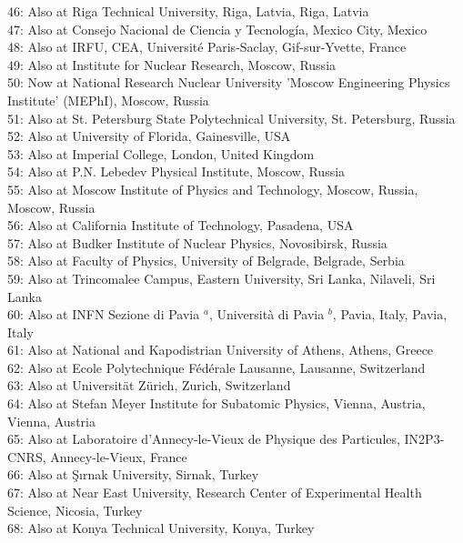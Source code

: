 46: Also at Riga Technical University, Riga, Latvia, Riga, Latvia\\
47: Also at Consejo Nacional de Ciencia y Tecnolog\'{i}a, Mexico City, Mexico\\
48: Also at IRFU, CEA, Universit\'{e} Paris-Saclay, Gif-sur-Yvette, France\\
49: Also at Institute for Nuclear Research, Moscow, Russia\\
50: Now at National Research Nuclear University 'Moscow Engineering Physics Institute' (MEPhI), Moscow, Russia\\
51: Also at St. Petersburg State Polytechnical University, St. Petersburg, Russia\\
52: Also at University of Florida, Gainesville, USA\\
53: Also at Imperial College, London, United Kingdom\\
54: Also at P.N. Lebedev Physical Institute, Moscow, Russia\\
55: Also at Moscow Institute of Physics and Technology, Moscow, Russia, Moscow, Russia\\
56: Also at California Institute of Technology, Pasadena, USA\\
57: Also at Budker Institute of Nuclear Physics, Novosibirsk, Russia\\
58: Also at Faculty of Physics, University of Belgrade, Belgrade, Serbia\\
59: Also at Trincomalee Campus, Eastern University, Sri Lanka, Nilaveli, Sri Lanka\\
60: Also at INFN Sezione di Pavia $^{a}$, Universit\`{a} di Pavia $^{b}$, Pavia, Italy, Pavia, Italy\\
61: Also at National and Kapodistrian University of Athens, Athens, Greece\\
62: Also at Ecole Polytechnique F\'{e}d\'{e}rale Lausanne, Lausanne, Switzerland\\
63: Also at Universit\"{a}t Z\"{u}rich, Zurich, Switzerland\\
64: Also at Stefan Meyer Institute for Subatomic Physics, Vienna, Austria, Vienna, Austria\\
65: Also at Laboratoire d'Annecy-le-Vieux de Physique des Particules, IN2P3-CNRS, Annecy-le-Vieux, France\\
66: Also at \c{S}{\i}rnak University, Sirnak, Turkey\\
67: Also at Near East University, Research Center of Experimental Health Science, Nicosia, Turkey\\
68: Also at Konya Technical University, Konya, Turkey\\
